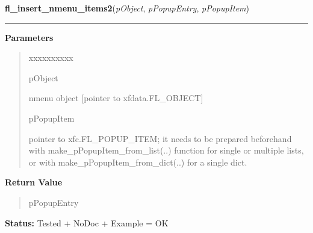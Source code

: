\hspace{.8\funcindent}\begin{boxedminipage}{\funcwidth}

    \raggedright \textbf{fl\_insert\_nmenu\_items2}(\textit{pObject}, \textit{pPopupEntry}, \textit{pPopupItem})

    \vspace{-1.5ex}

    \rule{\textwidth}{0.5\fboxrule}
\setlength{\parskip}{2ex}
\setlength{\parskip}{1ex}
      \textbf{Parameters}
      \vspace{-1ex}

      \begin{quote}
        \begin{Ventry}{xxxxxxxxxx}

          \item[pObject]

          nmenu object [pointer to xfdata.FL\_OBJECT]

          \item[pPopupItem]

          pointer to xfc.FL\_POPUP\_ITEM; it needs to be prepared 
          beforehand with make\_pPopupItem\_from\_list(..) function for 
          single or multiple lists, or with 
          make\_pPopupItem\_from\_dict(..) for a single dict.

        \end{Ventry}

      \end{quote}

      \textbf{Return Value}
    \vspace{-1ex}

      \begin{quote}
      pPopupEntry

      \end{quote}

\textbf{Status:} Tested + NoDoc + Example = OK



    \end{boxedminipage}

    \label{xformslib:library:fl_replace_nmenu_items2}

    \vspace{0.5ex}


